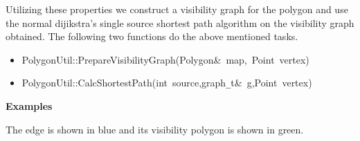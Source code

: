 \documentclass[a4paper,10pt]{article}
\begin{document}
Utilizing these properties we construct a visibility graph for the polygon and use the normal dijikstra's single source shortest path
 algorithm on the visibility graph obtained. The following two functions do the above mentioned tasks.



\begin{itemize}


\item

{
\noindent \ttfamily
\noindent \ttfamily
\noindent \ttfamily
\noindent \ttfamily
\jttstylek PolygonUtil::PrepareVisibilityGraph\jttstylei (\jttstylek Polygon\&~map,~Point~vertex\jttstylei [])\\

}


\item

{
\noindent \ttfamily
\jttstylek PolygonUtil::CalcShortestPath\jttstylei (\jttstylej int~\jttstylek source,graph\verb#_#t\&~g,Point~vertex\jttstylei [])\\
\noindent \ttfamily
}

\end{itemize}

{\bf Examples}

The edge is shown in blue and its visibility polygon is shown in green.
\end{document}
